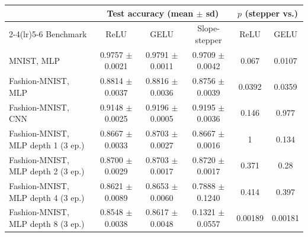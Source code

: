 \begin{tabular}{lccccc}
\toprule
 & \multicolumn{3}{c}{Test accuracy (mean $\pm$ sd)} & \multicolumn{2}{c}{$p$ (stepper vs.)} \\
\cmidrule(lr){2-4}\cmidrule(lr){5-6}
Benchmark & ReLU & GELU & Slope-stepper & ReLU & GELU \\
\midrule
MNIST, MLP & 0.9757 $\pm$ 0.0021 & 0.9791 $\pm$ 0.0011 & 0.9709 $\pm$ 0.0042 & 0.067 & 0.0107 \\
Fashion-MNIST, MLP & 0.8814 $\pm$ 0.0037 & 0.8816 $\pm$ 0.0036 & 0.8756 $\pm$ 0.0039 & 0.0392 & 0.0359 \\
Fashion-MNIST, CNN & 0.9148 $\pm$ 0.0025 & 0.9196 $\pm$ 0.0005 & 0.9195 $\pm$ 0.0036 & 0.146 & 0.977 \\
Fashion-MNIST, MLP depth 1 (3 ep.) & 0.8667 $\pm$ 0.0033 & 0.8703 $\pm$ 0.0027 & 0.8667 $\pm$ 0.0016 & 1 & 0.134 \\
Fashion-MNIST, MLP depth 2 (3 ep.) & 0.8700 $\pm$ 0.0029 & 0.8703 $\pm$ 0.0017 & 0.8720 $\pm$ 0.0017 & 0.371 & 0.28 \\
Fashion-MNIST, MLP depth 4 (3 ep.) & 0.8621 $\pm$ 0.0089 & 0.8653 $\pm$ 0.0060 & 0.7888 $\pm$ 0.1240 & 0.414 & 0.397 \\
Fashion-MNIST, MLP depth 8 (3 ep.) & 0.8548 $\pm$ 0.0038 & 0.8617 $\pm$ 0.0048 & 0.1321 $\pm$ 0.0557 & 0.00189 & 0.00181 \\
\bottomrule
\end{tabular}
